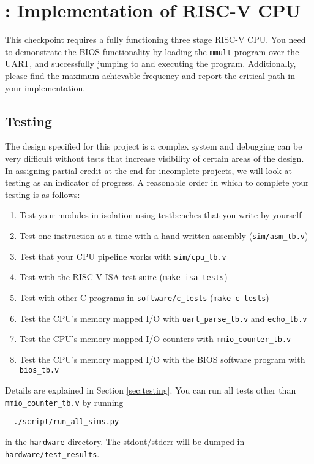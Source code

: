 \section{\baseCPUTaskName: Implementation of RISC-V CPU}

This checkpoint requires a fully functioning three stage RISC-V CPU.
You need to demonstrate the BIOS functionality by loading the \verb|mmult| program over the UART,
and successfully jumping to and executing the program.
Additionally, please find the maximum achievable frequency
and report the critical path in your implementation.


\subsection{Testing}
\label{testing}
The design specified for this project is a complex system and debugging can be very difficult without tests that increase visibility of certain areas of the design.
In assigning partial credit at the end for incomplete projects, we will look at testing as an indicator of progress.
A reasonable order in which to complete your testing is as follows:

\begin{enumerate}
  \item Test your modules in isolation using testbenches that you write by yourself
  \item Test one instruction at a time with a hand-written assembly (\verb|sim/asm_tb.v|)
  \item Test that your CPU pipeline works with \verb|sim/cpu_tb.v|
  \item Test with the RISC-V ISA test suite (\verb|make isa-tests|)
  \item Test with other C programs in \verb|software/c_tests| (\verb|make c-tests|)
  \item Test the CPU's memory mapped I/O with \verb|uart_parse_tb.v| and \verb|echo_tb.v|
  \item Test the CPU's memory mapped I/O counters with \verb|mmio_counter_tb.v|
  \item Test the CPU's memory mapped I/O with the BIOS software program with \verb|bios_tb.v|
\end{enumerate}

Details are explained in Section \ref{sec:testing}.
You can run all tests other than \verb|mmio_counter_tb.v| by running
\begin{verbatim}
  ./script/run_all_sims.py
\end{verbatim}
in the \verb|hardware| directory.
The stdout/stderr will be dumped in \verb|hardware/test_results|.


